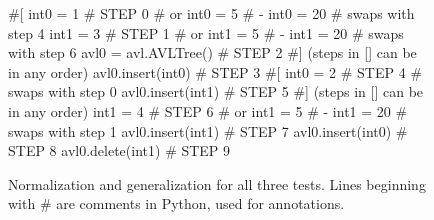 \begin{figure}[t]
{\scriptsize
\begin{code}
\textcolor{black!60}{\#[}
int0 = 1                              \textcolor{black!60}{\# STEP 0}
\textcolor{black!60}{\#  or int0 = 5 }
\textcolor{black!60}{\#   - int0 = 20} 
\textcolor{black!60}{\#  swaps with step 4}
int1 = 3                              \textcolor{black!60}{\# STEP 1}
\textcolor{black!60}{\#  or int1 = 5 }
\textcolor{black!60}{\#   - int1 = 20} 
\textcolor{black!60}{\#  swaps with step 6}
avl0 = avl.AVLTree()                  \textcolor{black!60}{\# STEP 2}
\textcolor{black!60}{\#] (steps in [] can be in any order)}
avl0.insert(int0)                     \textcolor{black!60}{\# STEP 3}
\textcolor{black!60}{\#[}
int0 = 2                              \textcolor{black!60}{\# STEP 4}
\textcolor{black!60}{\#  swaps with step 0}
avl0.insert(int1)                     \textcolor{black!60}{\# STEP 5}
\textcolor{black!60}{\#] (steps in [] can be in any order)}
int1 = 4                              \textcolor{black!60}{\# STEP 6}
\textcolor{black!60}{\#  or int1 = 5 }
\textcolor{black!60}{\#   - int1 = 20} 
\textcolor{black!60}{\#  swaps with step 1}
avl0.insert(int1)                     \textcolor{black!60}{\# STEP 7}
avl0.insert(int0)                     \textcolor{black!60}{\# STEP 8}
avl0.delete(int1)                     \textcolor{black!60}{\# STEP 9}
\end{code}

}
\caption{{Normalization and generalization for all three tests.
  Lines beginning with \# are comments in Python, used for annotations.}}
\label{normalgen}
\end{figure}

